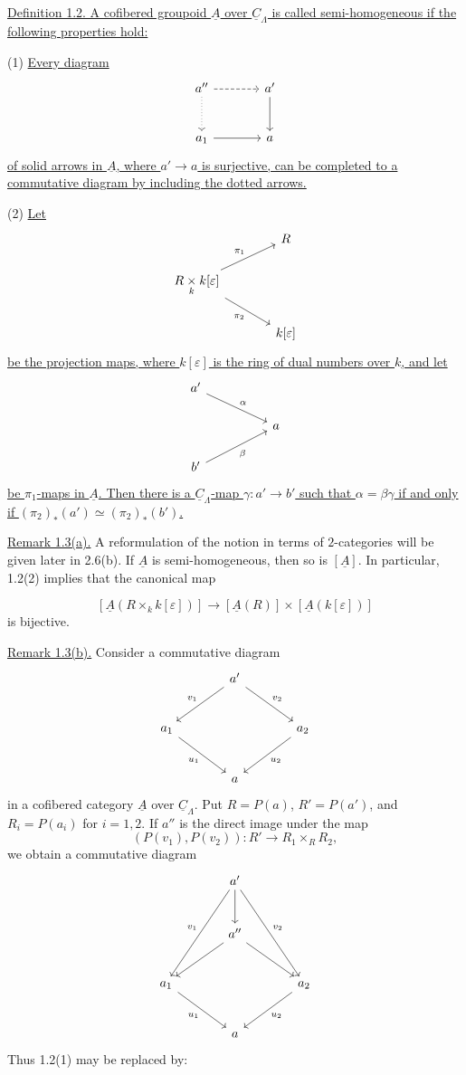 \underline{Definition 1.2. A cofibered groupoid $\underline A$ over
$\underline C_\Lambda$ is called semi-homogeneous if the following
properties hold:}

(1) \underline{Every diagram}
\[
\begin{tikzcd}[row sep=large,column sep=large]
a'' \arrow[r,dashed] \arrow[d,dotted] & a' \arrow[d] \\
a_1 \arrow[r] & a
\end{tikzcd}
\]
\underline{of solid arrows in $\underline A$, where
$a'\longrightarrow a$ is surjective, can be completed to a commutative
diagram by including the dotted arrows.}

(2) \underline{Let}
\[
\begin{tikzcd}[column sep=large]
& R \\
R\underset{k}{\times}k[\varepsilon]
 \arrow[ur,"\pi_1"] \arrow[dr,"\pi_2"'] & \\
& k[\varepsilon]
\end{tikzcd}
\]
\underline{be the projection maps, where $k[\varepsilon]$ is the ring
of dual numbers over $k$, and let}
\[
\begin{tikzcd}[column sep=huge]
a' \arrow[dr,"\alpha"] & \\
& a \\
b' \arrow[ur,"\beta"'] &
\end{tikzcd}
\]
\underline{be $\pi_1$-maps in $\underline A$. Then there is a
$\underline C_\Lambda$-map $\gamma:a'\longrightarrow b'$ such that
$\alpha=\beta\gamma$ if and only if
$(\pi_2)_*(a')\simeq(\pi_2)_*(b')$.}

\underline{Remark 1.3(a).} A reformulation of the notion in terms of
$2$-categories will be given later in 2.6(b). If $\underline A$ is
semi-homogeneous, then so is $[\underline A]$. In particular, 1.2(2)
implies that the canonical map


\[
 [\underline A(R\times_k k[\varepsilon])]
 \longrightarrow
 [\underline A(R)]\times[\underline A(k[\varepsilon])]
\]
is bijective.

\underline{Remark 1.3(b).} Consider a commutative diagram
\[
\begin{tikzcd}[row sep=large,column sep=large]
& a' \arrow[dl,"v_1"'] \arrow[dr,"v_2"] & \\
a_1 \arrow[dr,"u_1"'] & & a_2 \arrow[dl,"u_2"] \\
& a &
\end{tikzcd}
\]
in a cofibered category $\underline A$ over $\underline C_\Lambda$.
Put $R=P(a)$, $R'=P(a')$, and $R_i=P(a_i)$ for $i=1,2$. If $a''$ is
the direct image under the map
\[
 (P(v_1),P(v_2)):R'\longrightarrow R_1\times_RR_2,
\]
we obtain a commutative diagram
\[
\begin{tikzcd}[row sep=large,column sep=large]
& a' \arrow[d] \arrow[ddl,"v_1"'] \arrow[ddr,"v_2"] & \\
& a'' \arrow[dl] \arrow[dr] & \\
a_1 \arrow[dr,"u_1"'] & & a_2 \arrow[dl,"u_2"] \\
& a &
\end{tikzcd}
\]
Thus 1.2(1) may be replaced by:

